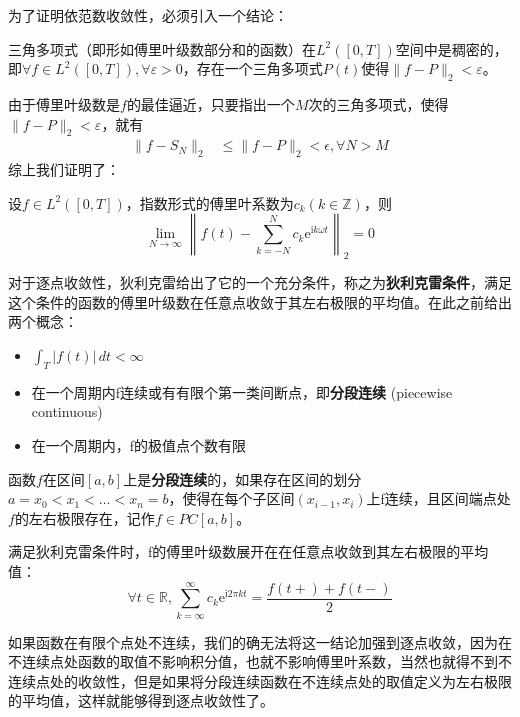 为了证明依范数收敛性，必须引入一个结论：
\begin{claim}
    三角多项式（即形如傅里叶级数部分和的函数）在$L^2([0,T])$空间中是稠密的，即$\forall f\in L^2([0,T]),\forall \varepsilon >0$，存在一个三角多项式$P(t)$使得$\|f-P\|_2<\varepsilon$。
\end{claim}

由于傅里叶级数是$f$的最佳逼近，只要指出一个$M$次的三角多项式，使得$\|f-P\|_2<\varepsilon$，就有
\begin{align*}
    \|f-S_N\|_2 & \leq \|f-P\|_2<\epsilon,\forall N>M
\end{align*}
综上我们证明了：
\begin{theorem}[傅里叶级数的依范数收敛性]
    设$f\in L^2([0,T])$，指数形式的傅里叶系数为$c_k(k\in\mathbb{Z} )$，则
    \[\lim_{N \to \infty} \left\| f(t)-\sum_{k=-N}^{N}c_k \mathrm{e}^{\mathrm{i}k\omega t}\right\|_2=0\]
\end{theorem}

对于逐点收敛性，狄利克雷给出了它的一个充分条件，称之为\textbf{狄利克雷条件}，满足这个条件的函数的傅里叶级数在任意点收敛于其左右极限的平均值。在此之前给出两个概念：

\begin{definition}[狄利克雷条件]
    \quad
    \begin{itemize}[nosep, left=0pt]
    \item $\int_{T}|f(t)|\,dt<\infty$
    \item 在一个周期内f连续或有有限个第一类间断点，即\textbf{分段连续} (piecewise continuous)
    \item 在一个周期内，f的极值点个数有限
\end{itemize}
\end{definition}
\begin{definition}[分段连续]
    函数$f$在区间$[a,b]$上是\textbf{分段连续}的，如果存在区间的划分$a=x_0<x_1<\dots <x_n=b$，使得在每个子区间$(x_{i-1},x_i)$上f连续，且区间端点处$f$的左右极限存在，记作$f\in PC[a,b]$。
\end{definition}

\begin{theorem}[狄利克雷定理]
    满足狄利克雷条件时，f的傅里叶级数展开在在任意点收敛到其左右极限的平均值：
    \[\forall t\in \mathbb{R},\sum_{k=\infty}^{\infty}c_k \mathrm{e}^{\mathrm{i}2\pi kt}=\frac{f(t+)+f(t-)}{2}\]
\end{theorem}

如果函数在有限个点处不连续，我们的确无法将这一结论加强到逐点收敛，因为在不连续点处函数的取值不影响积分值，也就不影响傅里叶系数，当然也就得不到不连续点处的收敛性，但是如果将分段连续函数在不连续点处的取值定义为左右极限的平均值，这样就能够得到逐点收敛性了。

